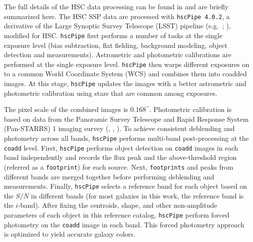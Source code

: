 \documentclass[a4paper,fleqn,usenatbib]{mnras}
\def\asec{$^{\prime\prime}$}
\begin{document}
    The full details of the HSC data processing can be found in \citet{Bosch2017}
    and are briefly summarized here. 
    The HSC SSP data are processed with \texttt{hscPipe 4.0.2}, a derivative of the 
    Large Synoptic Survey Telescope (LSST) pipeline (e.g.\ \citealt{Juric2015}; 
    \citealt{Axelrod2010}), modified for HSC. 
    \texttt{hscPipe} first performs a number of tasks at the single exposure level 
    (bias subtraction, flat fielding, background modeling, object detection and 
    measurements). 
    Astrometric and photometric calibrations are performed at the single exposure 
    level. 
    \texttt{hscPipe} then warps different exposures on to a common World Coordinate 
    System (WCS) and combines them into coadded images. 
    At this stage, \texttt{hscPipe} updates the images with a better astrometric and 
    photometric calibration using stars that are common among exposures. 
    
    The pixel scale of the combined images is $0.168$\asec{}. 
    Photometric calibration is based on data from the Panoramic Survey Telescope 
    and Rapid Response System (Pan-STARRS) 1 imaging survey 
    (\citealt{Schlafly2012}, \citealt{Tonry2012}, \citealt{Magnier2013}). 
    To achieve consistent deblending and photometry across all bands, \texttt{hscPipe} 
    performs multi-band post-processing at the \texttt{coadd} level. 
    First, \texttt{hscPipe} performs object detection on \texttt{coadd} images in 
    each band independently and records the flux peak and the above-threshold region 
    (referred as a \texttt{footprint}) for each source. 
    Next, \texttt{footprints} and peaks from different bands are merged together before     
    performing deblending and measurements. 
    Finally, \texttt{hscPipe} selects a reference band for each object based on the 
    $S/N$ in different bands (for most galaxies in this work, the reference band is 
    the $i$-band). 
    After fixing the centroids, shape, and other non-amplitude parameters of each 
    object in this reference catalog, \texttt{hscPipe} perform forced photometry 
    on the \texttt{coadd} image in each band. 
    This forced photometry approach is optimized to yield accurate galaxy colors. 
       
\end{document}
